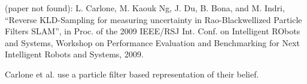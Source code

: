 (paper not found): L. Carlone, M. Kaouk Ng, J. Du, B. Bona, and M. Indri, “Reverse KLD-Sampling for measuring uncertainty in Rao-Blackwellized Particle Filters SLAM”, in Proc. of the 2009 IEEE/RSJ Int. Conf. on Intelligent RObots and Systems, Workshop on Performance Evaluation and Benchmarking for Next Intelligent Robots and Systems, 2009.

Carlone et al. use a particle filter based representation of their belief. 

